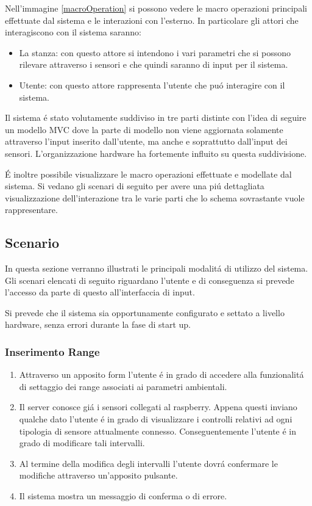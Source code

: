 Nell'immagine \ref{macroOperation} si possono vedere le macro operazioni principali effettuate dal sistema e le interazioni con l'esterno. In particolare gli attori che interagiscono con il sistema saranno:

\begin{itemize}
  \item La stanza: con questo attore si intendono i vari parametri che si possono rilevare attraverso i sensori e che quindi saranno di input per il sistema.
  \item Utente: con questo attore rappresenta l'utente che pu\'o interagire con il sistema.
\end{itemize}

Il sistema \'e stato volutamente suddiviso in tre parti distinte con l'idea di seguire un modello MVC dove la parte di modello non viene aggiornata solamente attraverso l'input inserito dall'utente, ma anche e soprattutto dall'input dei sensori. L'organizzazione hardware ha fortemente influito su questa suddivisione.

\'E inoltre possibile visualizzare le macro operazioni effettuate e modellate dal sistema. Si vedano gli scenari di seguito per avere una pi\'u dettagliata visualizzazione dell'interazione tra le varie parti che lo schema sovrastante vuole rappresentare.

\subsection{Scenario}

In questa sezione verranno illustrati le principali modalit\'a di utilizzo del sistema. Gli scenari elencati di seguito riguardano l'utente e di conseguenza si prevede l'accesso da parte di questo all'interfaccia di input.

Si prevede che il sistema sia opportunamente configurato e settato a livello hardware, senza errori durante la fase di start up.

\subsubsection{Inserimento Range}

\begin{enumerate}
  \item Attraverso un apposito form l'utente \'e in grado di accedere alla funzionalit\'a di settaggio dei range associati ai parametri ambientali.
  \item Il server conosce gi\'a i sensori collegati al raspberry. Appena questi inviano qualche dato l'utente \'e in grado di visualizzare i controlli relativi ad ogni tipologia di sensore attualmente connesso. Conseguentemente l'utente \'e in grado di modificare tali intervalli.
  \item Al termine della modifica degli intervalli l'utente dovr\'a confermare le modifiche attraverso un'apposito pulsante.
  \item Il sistema mostra un messaggio di conferma o di errore.
\end{enumerate}

